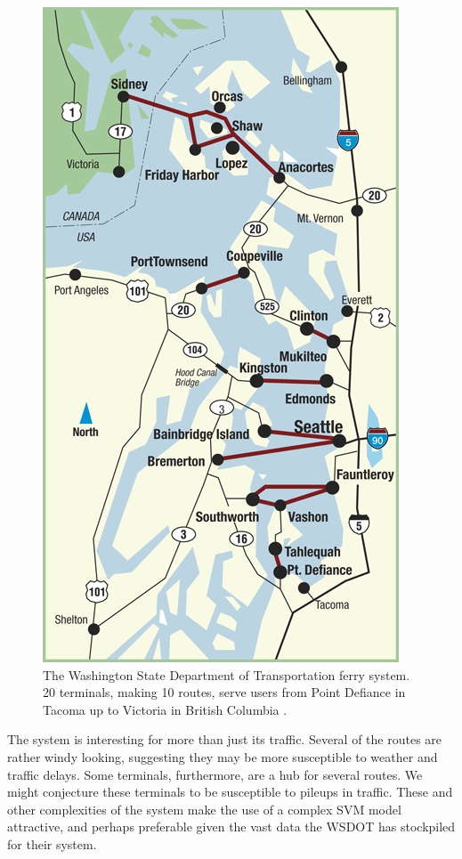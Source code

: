 \documentclass[11pt]{article} %
\begin{document}
\begin{figure}
  \centering
  \includegraphics[scale=.4]{images/route-map-overview.png}
  \caption{The Washington State Department of Transportation ferry system. 20
  terminals, making 10 routes, serve users from Point Defiance in Tacoma up to
  Victoria in British Columbia \cite{wsdotVesselWatch}.}
  \label{fig:ferry_system}
\end{figure}

The system is interesting for more than just its traffic. Several of the routes
are rather windy looking, suggesting they may be more susceptible to weather and
traffic delays. Some terminals, furthermore, are a hub for several routes. We
might conjecture these terminals to be susceptible to pileups in traffic. These 
and other complexities of the system make the use of a complex SVM model attractive,
and perhaps preferable given the vast data the WSDOT has stockpiled for their
system. 
\end{document}
